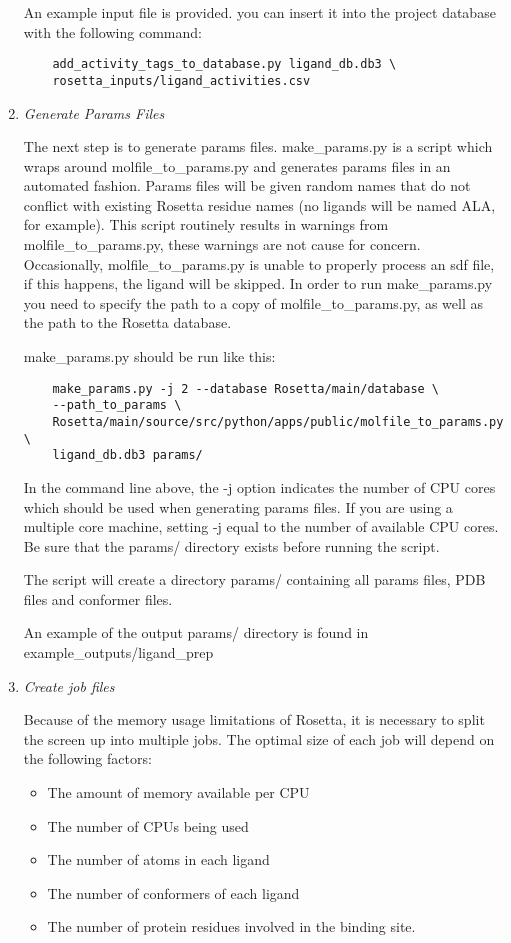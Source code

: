\begin{enumerate}
	An example input file is provided. you can insert it into the project
	database with the following command:

	\begin{verbatim}
	add_activity_tags_to_database.py ligand_db.db3 \
	rosetta_inputs/ligand_activities.csv
	\end{verbatim}
	\item
	\emph{Generate Params Files}

	The next step is to generate params files. make\_params.py is a script which wraps around molfile\_to\_params.py and generates params files in an automated fashion.
	Params files will be given random names that do not conflict with existing Rosetta residue names (no ligands will be named ALA, for example).
	This script routinely results in warnings from molfile\_to\_params.py, these warnings are not cause for concern.
	Occasionally, molfile\_to\_params.py is unable to properly process an sdf file, if this happens, the ligand will be skipped. 
	In order to run make\_params.py you need to specify the path to a copy of molfile\_to\_params.py, as well as the path to the Rosetta database.
	
	make\_params.py should be run like this:

	\begin{verbatim}
	make_params.py -j 2 --database Rosetta/main/database \
	--path_to_params \
	Rosetta/main/source/src/python/apps/public/molfile_to_params.py \
	ligand_db.db3 params/
	\end{verbatim}

	In the command line above, the -j option indicates the number of \ac{CPU} cores which should be used when generating params files.
	If you are using a multiple core machine, setting -j equal to the number of available \ac{CPU} cores.
	Be sure that the params/ directory exists before running the script.

	The script will create a directory params/ containing all params files, \ac{PDB} files and conformer files.

	An example of the output params/ directory is found in example\_outputs/ligand\_prep
\item
	\emph{Create job files}

	Because of the memory usage limitations of Rosetta, it is necessary to split the screen up into multiple jobs.
	The optimal size of each job will depend on the following factors:

	\begin{itemize}
	\itemsep1pt\parskip0pt\parsep0pt
	\item
 		The amount of memory available per \ac{CPU}
	\item
    		The number of \ac{CPU}s being used
	\item
 		The number of atoms in each ligand
	\item
		The number of conformers of each ligand
	\item
		The number of protein residues involved in the binding site.
	\end{itemize}


\end{enumerate}
